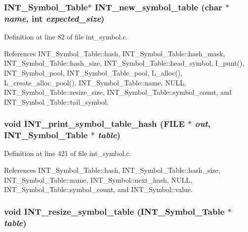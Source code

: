\subsubsection{\setlength{\rightskip}{0pt plus 5cm}\bf{INT\_\-Symbol\_\-Table}$\ast$ INT\_\-new\_\-symbol\_\-table (char $\ast$ {\em name}, int {\em expected\_\-size})}\label{int__symbol_8c_934c16acb34dcf5ecc68557a95b3ab91}




Definition at line 82 of file int\_\-symbol.c.

References INT\_\-Symbol\_\-Table::hash, INT\_\-Symbol\_\-Table::hash\_\-mask, INT\_\-Symbol\_\-Table::hash\_\-size, INT\_\-Symbol\_\-Table::head\_\-symbol, I\_\-punt(), INT\_\-Symbol\_\-pool, INT\_\-Symbol\_\-Table\_\-pool, L\_\-alloc(), L\_\-create\_\-alloc\_\-pool(), INT\_\-Symbol\_\-Table::name, NULL, INT\_\-Symbol\_\-Table::resize\_\-size, INT\_\-Symbol\_\-Table::symbol\_\-count, and INT\_\-Symbol\_\-Table::tail\_\-symbol.
\subsubsection{\setlength{\rightskip}{0pt plus 5cm}void INT\_\-print\_\-symbol\_\-table\_\-hash (FILE $\ast$ {\em out}, \bf{INT\_\-Symbol\_\-Table} $\ast$ {\em table})}\label{int__symbol_8c_b3a43802ef643a29ed29c1ed5abbeaa7}




Definition at line 421 of file int\_\-symbol.c.

References INT\_\-Symbol\_\-Table::hash, INT\_\-Symbol\_\-Table::hash\_\-size, INT\_\-Symbol\_\-Table::name, INT\_\-Symbol::next\_\-hash, NULL, INT\_\-Symbol\_\-Table::symbol\_\-count, and INT\_\-Symbol::value.
\subsubsection{\setlength{\rightskip}{0pt plus 5cm}void INT\_\-resize\_\-symbol\_\-table (\bf{INT\_\-Symbol\_\-Table} $\ast$ {\em table})}\label{int__symbol_8c_41b2694857642c31a631f5a6e8c65701}




